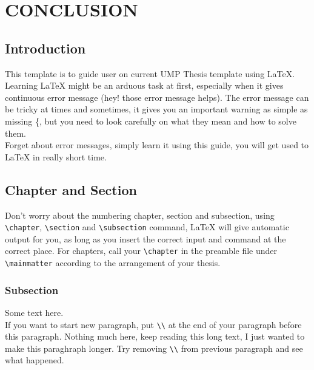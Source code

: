 \chapter{CONCLUSION}

\section{Introduction}
This template is to guide user on current UMP Thesis template using {\LaTeX}. Learning {\LaTeX} might be an arduous task at first, especially when it gives continuous error message (hey! those error message helps). The error message can be tricky at times and sometimes, it gives you an important warning as simple as missing \{, but you need to look carefully on what they mean and how to solve them.\\

Forget about error messages, simply learn it using this guide, you will get used to {\LaTeX} in really short time.

\section{Chapter and Section}
Don't worry about the numbering chapter, section and subsection, using \verb+\chapter+, \verb+\section+ and \verb+\subsection+ command, {\LaTeX} will give automatic output for you, as long as you insert the correct input and command at the correct place. For chapters, call your \verb+\chapter+ in the preamble file under \verb+\mainmatter+ according to the arrangement of your thesis.

\subsection{Subsection}
Some text here.\\

If you want to start new paragraph, put \verb+\\+ at the end of your paragraph before this paragraph. Nothing much here, keep reading this long text, I just wanted to make this paraghraph longer. Try removing \verb+\\+ from previous paragraph and see what happened.\\

